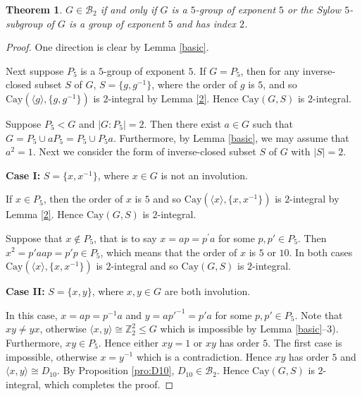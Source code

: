 \documentclass[12pt,a4paper]{article}
\newtheorem{thm}{Theorem}[section]
\def \leq {\leqslant}
\begin{document}
	\begin{thm}\label{thm:B2}
		$G\in \mathcal{B}_2$ if and only if $G$ is a $5$-group of exponent $5$ or the Sylow $5$-subgroup of $G$ is a group of exponent $5$ and has index $2$.  
	\end{thm}
	\begin{proof}
		One direction is clear by Lemma \ref{basic}.
		
		Next suppose $P_5$ is a $5$-group of exponent $5$.
		If $G=P_5$, then for any inverse-closed subset $S$ of $G$, $S=\{g,g^{-1}\}$, where the order of $g$ is $5$, and so $\mathrm{Cay}(\langle g\rangle,\{g,g^{-1}\})$ is $2$-integral by Lemma \ref{2}.
		Hence $\mathrm{Cay}(G,S)$ is $2$-integral.
		
		Suppose $P_5<G$ and $|G:P_5|=2$. 
		Then there exist $a\in G$ such that $G=P_5\cup aP_5=P_5\cup P_5a$. Furthermore, by Lemma \ref{basic}, we may assume that $a^2=1$.
		Next we consider the form of inverse-closed subset $S$ of $G$ with $|S|=2$.
		
		{\bf Case I:} $S=\{x,x^{-1}\}$, where $x\in G$ is not an involution.
		
		If $x\in P_5$, then the order of $x$ is $5$ and so $\mathrm{Cay}(\langle x\rangle,\{x,x^{-1}\})$ is $2$-integral by Lemma \ref{2}.
		Hence $\mathrm{Cay}(G,S)$ is $2$-integral.
		
		Suppose that $x\notin P_5$, that is to say $x=ap=p^{'}a$ for some $p,p'\in P_5$. Then $x^2=p'aap=p'p\in P_5$, which means that the order of $x$ is $5$ or $10$. In both cases $\mathrm{Cay}(\langle x\rangle,\{x,x^{-1}\})$ is $2$-integral and so $\mathrm{Cay}(G,S)$ is $2$-integral.
		
		
		
		
		{\bf Case II:} $S=\{x,y\}$, where $x,y\in G$ are both involution.
		
		In this case, $x=ap=p^{-1}a$ and $y=ap'^{-1}=p'a$ for some $p,p'\in P_5$. Note that $xy\neq yx$, otherwise $\langle x,y\rangle\cong \mathbb{Z}_2^2\leq G$ which is impossible by Lemma \ref{basic}--3). Furthermore, $xy\in P_5$. Hence either $xy=1$ or $xy$ has order $5$. The first case is impossible, otherwise $x=y^{-1}$ which is a contradiction. Hence $xy$ has order $5$ and  $\langle x,y\rangle\cong D_{10}$.
		By Proposition \ref{pro:D10}, $D_{10}\in\mathcal{B}_2$.
		Hence $\mathrm{Cay}(G,S)$ is $2$-integral, which completes the proof.
	\end{proof}
	
\end{document}
